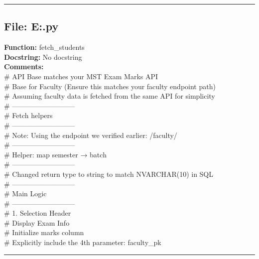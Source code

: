 {\hrule

\subsection*{File: E:\project\capstone\frontend\mem.py}
\textbf{Function:} fetch_students\\
\textbf{Docstring:} No docstring\\
\textbf{Comments:}\\
# API Base matches your MST Exam Marks API\\
# Base for Faculty (Ensure this matches your faculty endpoint path)\\
# Assuming faculty data is fetched from the same API for simplicity\\
# ---------------------------\\
# Fetch helpers\\
# ---------------------------\\
# Note: Using the endpoint we verified earlier: /faculty/\\
# ---------------------------\\
# Helper: map semester → batch\\
# ---------------------------\\
# Changed return type to string to match NVARCHAR(10) in SQL\\
# ---------------------------\\
# Main Logic\\
# ---------------------------\\
# 1. Selection Header\\
# Display Exam Info\\
# Initialize marks column\\
# Explicitly include the 4th parameter: faculty\_pk\\

\hrule

}
